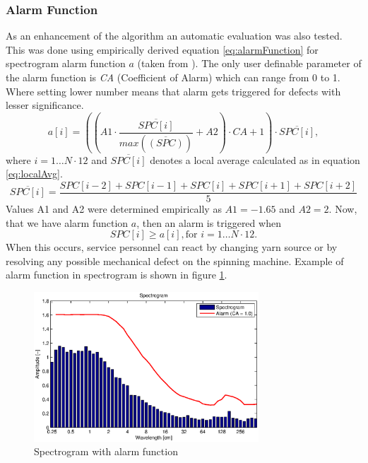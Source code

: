 \documentclass[twoside]{ctuthesis}
\theoremstyle{plain}
\theoremstyle{definition}
\theoremstyle{note}
\begin{document}
\subsubsection{Alarm Function}
As an enhancement of the algorithm an automatic evaluation was also tested. This was done using empirically derived equation \ref{eq:alarmFunction} for spectrogram alarm function $a$ (taken from \cite{cite:1}). The only user definable parameter of the alarm function is \textit{CA} (Coefficient of Alarm) which can range from 0 to 1. Where setting lower number means that alarm gets triggered for defects with lesser significance.
\begin{equation} \label{eq:alarmFunction}
	a[i] = \left(\left( A1\cdot \frac{\overline{SPC[i]}}{max(\overline{(SPC)})}+A2\right) \cdot CA + 1 \right) \cdot \overline{SPC[i]},
\end{equation}
where $i=1\ldots N \cdot 12$ and $\overline{SPC[i]}$ denotes a local average calculated as in equation \ref{eq:localAvg}.
\begin{equation} \label{eq:localAvg}
	\overline{SPC[i]} = \frac{SPC[i-2]+SPC[i-1]+SPC[i]+SPC[i+1]+SPC[i+2]}{5}
\end{equation}
Values A1 and A2 were determined empirically as $A1=-1.65$ and $A2=2$.
Now, that we have alarm function $a$, then an alarm is triggered when
\begin{equation} \label{eq:alarmTrig}
	SPC[i] \geq a[i], \text{for } i=1\ldots N \cdot 12.
\end{equation}
When this occurs, service personnel can react by changing yarn source or by resolving any possible mechanical defect on the spinning machine. Example of alarm function in spectrogram is shown in figure \ref{fig:alarm1}.
\begin{figure}[h]
	\centering
	\includegraphics[width=0.75\textwidth]{prize1_alarm.eps}
	\caption{Spectrogram with alarm function}
	\label{fig:alarm1}
\end{figure}
\end{document}
